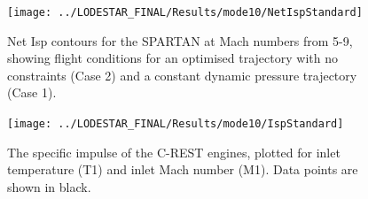 \begin{figure}[ht!]
	\centering
	\texttt{[image: ../LODESTAR\_FINAL/Results/mode10/NetIspStandard]}
	\caption{Net Isp contours for the SPARTAN at Mach numbers from 5-9, showing flight conditions for an optimised trajectory with no constraints (Case 2) and a constant dynamic pressure trajectory (Case 1).}
	\label{fig:NetIspStandardNoReturn}
\end{figure}

\begin{figure}[ht!]
	\centering
	\texttt{[image: ../LODESTAR\_FINAL/Results/mode10/IspStandard]}
	\caption{The specific impulse of the C-REST engines, plotted for inlet temperature (T1) and inlet Mach number (M1). Data points are shown in black.}
	\label{fig:IspStandard}
\end{figure}


